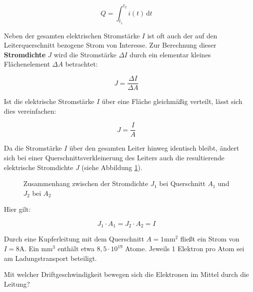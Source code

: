 {\begin{equation}
	Q = \int_{t_1}^{t_2} i(t) \, \mathrm{d} t	
\end{equation}

Neben der gesamten elektrischen Stromstärke $I$ ist oft auch der auf den Leiterquerschnitt bezogene Strom von Interesse.
Zur Berechnung dieser \textbf{Stromdichte} $J$ wird die Stromstärke $\Delta I$ durch ein elementar kleines Flächenelement $\Delta A$
betrachtet: 

\begin{equation}
	J = \frac{\Delta I}{\Delta A}
\end{equation}

Ist die elektrische Stromstärke $I$ über eine Fläche gleichmäßig verteilt, lässt sich dies vereinfachen:

\begin{equation}
	J = \frac{I}{A}
\end{equation}

Da die Stromstärke $I$ über den gesamten Leiter hinweg identisch bleibt, ändert sich bei einer 
Querschnittsverkleinerung des Leiters auch die resultierende elektrische Stromdichte $J$ (siehe Abbildung \ref{fig:stromdichte}).

\begin{figure}[h!]
	\centering
	
	\caption{Zusammenhang zwischen der Stromdichte $J_1$ bei Querschnitt $A_1$ und $J_2$ bei $A_2$}
	\label{fig:stromdichte}
\end{figure}

Hier gilt:

\begin{equation*}
	J_1 \cdot A_1 = J_2 \cdot A_2 = I
\end{equation*}





\begin{bsp}{}{}

	Durch eine Kupferleitung mit dem Querschnitt $A = 1 \mathrm{mm}^2$ fließt ein Strom von $I = 8 \mathrm{A}$. 
	Ein $\mathrm{mm}^3$ enthält etwa $ 8,5 \cdot 10^{19}$ Atome. Jeweils 1 Elektron pro Atom sei am Ladungstransport beteiligt.

	\begin{center}
		
	\end{center}
	

	

	Mit welcher Driftgeschwindigkeit bewegen sich die Elektronen im Mittel durch die Leitung?


\end{bsp}}

